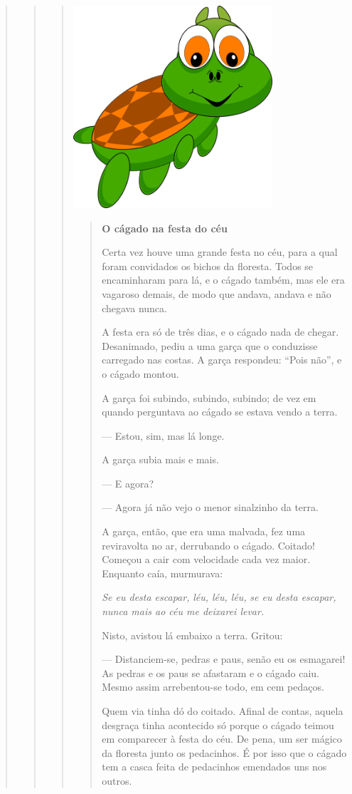 \begin{quote}
\begin{quote}
\begin{quote}
\includegraphics[width=2.90902in,height=2.95828in]{media/image19.png}

\begin{quote}
\textbf{O cágado na festa do céu}

Certa vez houve uma grande festa no céu, para a qual foram convidados os
bichos da floresta. Todos se encaminharam para lá, e o cágado também, mas
ele era vagaroso demais, de modo que andava, andava e não chegava
nunca.

A festa era só de três dias, e o cágado nada de chegar. Desanimado, pediu
a uma garça que o conduzisse carregado nas costas. A garça respondeu: ``Pois não'', e
o cágado montou.

A garça foi subindo, subindo, subindo; de vez em quando perguntava ao
cágado se estava vendo a terra.

--- Estou, sim, mas lá longe.

A garça subia mais e mais.

--- E agora?

--- Agora já não vejo o menor sinalzinho da terra.

A garça, então, que era uma malvada, fez uma reviravolta no ar,
derrubando o cágado. Coitado! Começou a cair com velocidade cada vez
maior. Enquanto caía, murmurava:

\emph{Se eu desta escapar,}
\emph{léu, léu, léu,}
\emph{se eu desta escapar,}
\emph{nunca mais ao céu me deixarei levar.}

Nisto, avistou lá embaixo a terra. Gritou:

--- Distanciem-se, pedras e paus, senão eu os esmagarei! As pedras e os paus
se afastaram e o cágado caiu. Mesmo assim arrebentou-se todo, em cem
pedaços.

Quem via tinha dó do coitado. Afinal de contas, aquela
desgraça tinha acontecido só porque o cágado teimou em comparecer à festa do
céu. De pena, um ser mágico da floresta junto os pedacinhos.
É por isso que o cágado tem a casca feita de pedacinhos emendados uns
nos outros.


\end{quote}
\end{quote}
\end{quote}
\end{quote}

